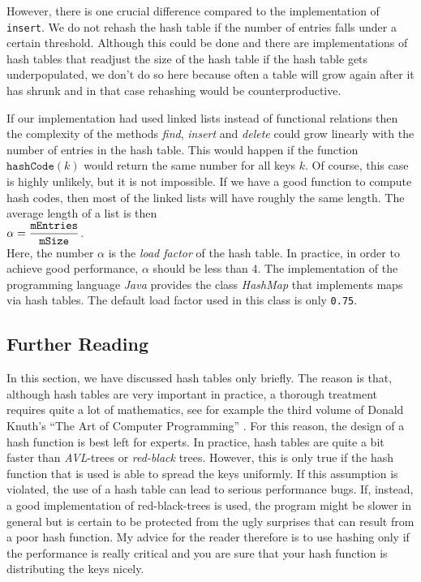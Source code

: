 However, there is one crucial difference compared to the implementation of \texttt{insert}.
We do not rehash the hash table if the number of entries falls under a certain threshold.
Although this could be done and there are implementations of hash tables that readjust the size of the
hash table if the hash table gets underpopulated, we don't do so here because often a table will
grow again after it has shrunk and in that case rehashing would be counterproductive.

If our implementation had used linked lists instead of functional relations then the complexity of
the methods  \textsl{find}, \textsl{insert} and \textsl{delete} could grow linearly with the number
of entries in the hash table.  This would happen if the function 
$\texttt{hashCode}(k)$ would return the same number for all keys $k$.  Of course, this case is
highly unlikely, but it is not impossible.  If we have a good function to compute hash codes, then
most of the linked lists will have roughly the same length.  The average length of a list is then
 \\[0.2cm]
\hspace*{1.3cm}
 $\alpha = \displaystyle \frac{\mathtt{mEntries}}{\mathtt{mSize}}$. 
\\[0.2cm]
Here, the number $\alpha$ is the \emph{load factor} of the hash table.  In practice, in order to
achieve good performance, $\alpha$ should be less than 4.  The implementation of the programming
language \textsl{Java} provides the class  \textsl{HashMap} that implements maps via hash tables.
The default load factor used in this class is only \texttt{0.75}.


\subsection{Further Reading}
In this section, we have discussed hash tables only briefly.  The reason is that, although hash tables are very
important in practice, a thorough treatment requires quite a lot of mathematics, see for example the
third volume of Donald Knuth's ``The Art of Computer Programming'' \cite{knuth:1998b}.  For this
reason, the design of a hash function is best left for experts.  In practice, hash tables are
quite a bit faster than \textsl{AVL}-trees or \emph{red-black} trees.  However, this is only true if
the hash function that is used is able to spread the keys uniformly.  If this assumption is
violated, the use of a hash table can lead to serious performance 
bugs.  If, instead, a good
implementation of red-black-trees is used, the program might be slower in general but is certain to
be protected from the ugly surprises that can result from a poor hash function.  My advice for the reader
therefore is to use hashing only if the performance is really critical and you are sure that your
hash function is distributing the keys nicely.


